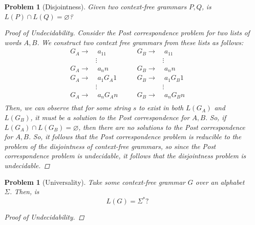 \documentclass[psamsfonts]{amsart}
\newtheorem{prob}[thm]{Problem}
\theoremstyle{definition}
\theoremstyle{remark}
\numberwithin{equation}{section}
\begin{document}
\begin{prob}[Disjointness]
  Given two context-free grammars $P,Q$, is $L(P)\cap L(Q) = \varnothing$?
  \begin{proof}[Proof of Undecidability]
    Consider the Post correspondence problem for two lists of words $A,B$. We
    construct two context free grammars from these lists as follows:
    \begin{equation*}
      \begin{split}
        G_A \rightarrow  &\;a_11 \\
        &\!\!\!\!\vdots \\
        G_A \rightarrow  &\;a_nn \\
        G_A \rightarrow  &\;a_1G_A1 \\
        &\!\!\!\!\vdots \\
        G_A \rightarrow  &\;a_nG_An \\
      \end{split}
      \qquad
      \begin{split}
        G_B \rightarrow  &\;a_11 \\
        &\!\!\!\!\vdots \\
        G_B \rightarrow  &\;a_nn \\
        G_B \rightarrow  &\;a_1G_B1 \\
        &\!\!\!\!\vdots \\
        G_B \rightarrow  &\;a_nG_Bn \\
      \end{split}
    \end{equation*}
    Then, we can observe that for some string $s$ to exist in both $L(G_A)$ and $L(G_B)$,
    it must be a solution to the Post correspondence for $A,B$. So, if $L(G_A)\cap
    L(G_B)=\varnothing$, then there are no solutions to the Post correspondence
    for $A,B$. So, it follows that the Post correspondence problem is reducible
    to the problem of the disjointness of context-free grammars, so since the
    Post correspondence problem is undecidable, it follows that the disjointness
    problem is undecidable.
  \end{proof}
\end{prob}

\begin{prob}[Universality]
  \label{prob:cfg:universality}
  Take some context-free grammar $G$ over an alphabet $\Sigma$. Then, is
  \[
    L(G) = \Sigma^*?
  \]
  \begin{proof}[Proof of Undecidability]
    
  \end{proof}
\end{prob}
\end{document}
